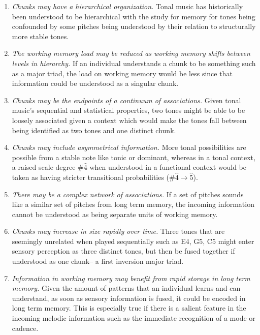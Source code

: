 \documentclass[]{book}
\providecommand{\tightlist}{%
  \setlength{\itemsep}{0pt}\setlength{\parskip}{0pt}}
\begin{document}
\begin{enumerate}
\def\labelenumi{\arabic{enumi}.}
\tightlist
\item
  \emph{Chunks may have a hierarchical organization.} Tonal music has historically been understood to be hierarchical \citep{krumhanslCognitiveFoundationsMusical2001, meyerEmotionMeaningMusic1956, schenkerFreieSatz1935} with the study for memory for tones being confounded by some pitches being understood by their relation to structurally more stable tones.
\item
  \emph{The working memory load may be reduced as working memory shifts between levels in hierarchy.} If an individual understands a chunk to be something such as a major triad, the load on working memory would be less since that information could be understood as a singular chunk.
\item
  \emph{Chunks may be the endpoints of a continuum of associations.} Given tonal music's sequential and statistical properties, two tones might be able to be loosely associated given a context which would make the tones fall between being identified as two tones and one distinct chunk.
\item
  \emph{Chunks may include asymmetrical information.} More tonal possibilities are possible from a stable note like tonic or dominant, whereas in a tonal context, a raised scale degree \#\(\hat{4}\) when understood in a functional context would be taken as having stricter transitional probabilities (\#\(\hat{4} \rightarrow \hat{5}\)).
\item
  \emph{There may be a complex network of associations.} If a set of pitches sounds like a similar set of pitches from long term memory, the incoming information cannot be understood as being separate units of working memory.
\item
  \emph{Chunks may increase in size rapidly over time.} Three tones that are seemingly unrelated when played sequentially such as E4, G5, C5 might enter sensory perception as three distinct tones, but then be fused together if understood as one chunk-- a first inversion major triad.
\item
  \emph{Information in working memory may benefit from rapid storage in long term memory.} Given the amount of patterns that an individual learns and can understand, as soon as sensory information is fused, it could be encoded in long term memory. This is especially true if there is a salient feature in the incoming melodic information such as the immediate recognition of a mode or cadence.
\end{enumerate}
\end{document}
